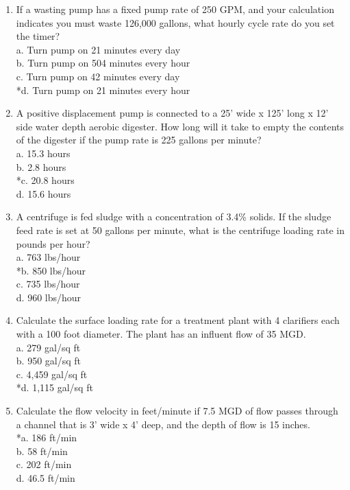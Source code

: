 \begin{enumerate}
\item If a wasting pump has a fixed pump rate of 250 GPM, and your calculation
indicates you must waste 126,000 gallons, what hourly cycle rate do you set
the timer?\\
a. Turn pump on 21 minutes every day\\
b. Turn pump on 504 minutes every hour\\
c. Turn pump on 42 minutes every day\\
*d. Turn pump on 21 minutes every hour\\

\item A positive displacement pump is connected to a 25' wide x 125' long x 12' side water depth aerobic digester. How long will it take to empty the contents of the digester if the pump rate is 225 gallons per minute?\\
a. 15.3 hours\\
b. 2.8 hours\\
*c. 20.8 hours\\
d. 15.6 hours\\

\item A centrifuge is fed sludge with a concentration of 3.4\% solids. If the sludge feed rate is set at 50 gallons per minute, what is the centrifuge loading rate
in pounds per hour?\\
a. 763 lbs/hour\\
*b. 850 lbs/hour\\
c. 735 lbs/hour\\
d. 960 lbs/hour\\

\item Calculate the surface loading rate for a treatment plant with 4 clarifiers each
with a 100 foot diameter. The plant has an influent flow of 35 MGD.\\
a. 279 gal/sq ft\\
b. 950 gal/sq ft\\
c. 4,459 gal/sq ft\\
*d. 1,115 gal/sq ft\\

\item Calculate the flow velocity in feet/minute if 7.5 MGD of flow passes through a channel that is 3' wide x 4' deep, and the depth of flow is 15 inches.\\
*a. 186 ft/min\\
b. 58 ft/min\\
c. 202 ft/min\\
d. 46.5 ft/min\\


\end{enumerate}

